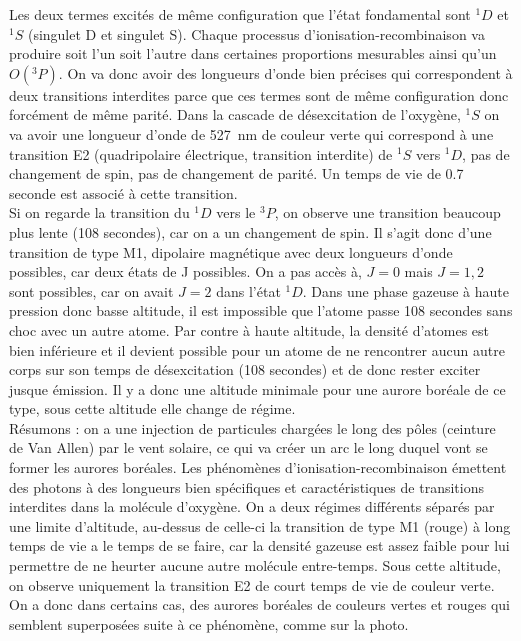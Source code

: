 Les deux termes excités de même configuration que l'état fondamental sont $^1D$ et $^1S$ (singulet D et singulet S). Chaque processus d'ionisation-recombinaison va produire soit l'un soit l'autre dans certaines proportions mesurables ainsi qu'un $O(^3P)$. On va donc avoir des longueurs d'onde bien précises qui correspondent à deux transitions interdites parce que ces termes sont de même configuration donc forcément de même parité. Dans la cascade de désexcitation de l'oxygène, $^1S$ on va avoir une longueur d'onde de \SI{527}{nm} de couleur verte qui correspond à une transition E2 (quadripolaire électrique, transition interdite) de  $^1S$ vers $^1D$, pas de changement de spin, pas de changement de parité. Un temps de vie de 0.7 seconde est associé à cette transition.\\

Si on regarde la transition du $^1D$ vers le $^3P$, on observe une transition beaucoup plus lente (108 secondes), car on a un changement de spin. Il s'agit donc d'une transition de type M1, dipolaire magnétique avec deux longueurs d'onde possibles, car deux états de J possibles. On a pas accès à, $J=0$ mais $J=1,2$ sont possibles, car on avait $J=2$ dans l'état $^1D$. Dans une phase gazeuse à haute pression donc basse altitude, il est impossible que l'atome passe 108 secondes sans choc avec un autre atome. Par contre à haute altitude, la densité d'atomes est bien inférieure et il devient possible pour un atome de ne rencontrer aucun autre corps sur son temps de désexcitation (108 secondes) et de donc rester exciter jusque émission. Il y a donc une altitude minimale pour une aurore boréale de ce type, sous cette altitude elle change de régime.\\

Résumons : on a une injection de particules chargées le long des pôles (ceinture de Van Allen) par le vent solaire, ce qui va créer un arc le long duquel vont se former les aurores boréales. Les phénomènes d'ionisation-recombinaison émettent des photons à des longueurs bien spécifiques et caractéristiques de transitions interdites dans la molécule d'oxygène. On a deux régimes différents séparés par une limite d'altitude, au-dessus de celle-ci la transition de type M1 (rouge) à long temps de vie a le temps de se faire, car la densité gazeuse est assez faible pour lui permettre de ne heurter aucune autre molécule entre-temps. Sous cette altitude, on observe uniquement la transition E2 de court temps de vie de couleur verte. On a donc dans certains cas, des aurores boréales de couleurs vertes et rouges qui semblent superposées suite à ce phénomène, comme sur la photo.\\

